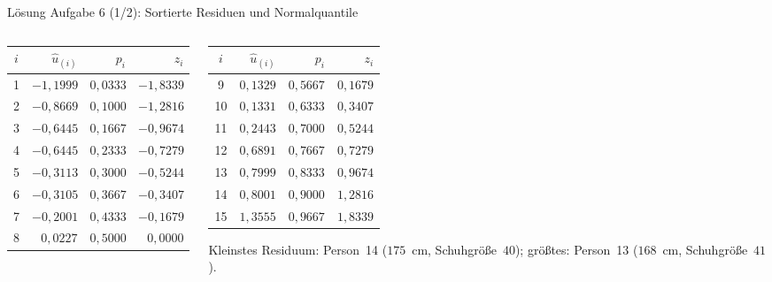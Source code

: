 \documentclass[aspectratio=169,11pt]{beamer}
\begin{document}
\begin{frame}{Lösung Aufgabe 6 (1/2): Sortierte Residuen und Normalquantile}
  \begin{columns}[T]
    \begin{column}{0.49\textwidth}
      \begin{center}
        \small
        \renewcommand{\arraystretch}{1.08}
        \begin{tabular}{c r r r}
          \toprule
          $i$ & $\hat{u}_{(i)}$ & $p_i$ & $z_i$ \\
          \midrule
          1 & $-1{,}1999$ & $0{,}0333$ & $-1{,}8339$ \\
          2 & $-0{,}8669$ & $0{,}1000$ & $-1{,}2816$ \\
          3 & $-0{,}6445$ & $0{,}1667$ & $-0{,}9674$ \\
          4 & $-0{,}6445$ & $0{,}2333$ & $-0{,}7279$ \\
          5 & $-0{,}3113$ & $0{,}3000$ & $-0{,}5244$ \\
          6 & $-0{,}3105$ & $0{,}3667$ & $-0{,}3407$ \\
          7 & $-0{,}2001$ & $0{,}4333$ & $-0{,}1679$ \\
          8 & $0{,}0227$  & $0{,}5000$ & $0{,}0000$ \\
          \bottomrule
        \end{tabular}
      \end{center}
    \end{column}
    \begin{column}{0.49\textwidth}
      \begin{center}
        \small
        \renewcommand{\arraystretch}{1.08}
        \begin{tabular}{c r r r}
          \toprule
          $i$ & $\hat{u}_{(i)}$ & $p_i$ & $z_i$ \\
          \midrule
          9  & $0{,}1329$ & $0{,}5667$ & $0{,}1679$ \\
          10 & $0{,}1331$ & $0{,}6333$ & $0{,}3407$ \\
          11 & $0{,}2443$ & $0{,}7000$ & $0{,}5244$ \\
          12 & $0{,}6891$ & $0{,}7667$ & $0{,}7279$ \\
          13 & $0{,}7999$ & $0{,}8333$ & $0{,}9674$ \\
          14 & $0{,}8001$ & $0{,}9000$ & $1{,}2816$ \\
          15 & $1{,}3555$ & $0{,}9667$ & $1{,}8339$ \\
          \bottomrule
        \end{tabular}
      \end{center}
      \footnotesize Kleinstes Residuum: Person~14 ($175$~cm, Schuhgröße~$40$);
      größtes: Person~13 ($168$~cm, Schuhgröße~$41$).
    \end{column}
  \end{columns}
\end{frame}
\end{document}
